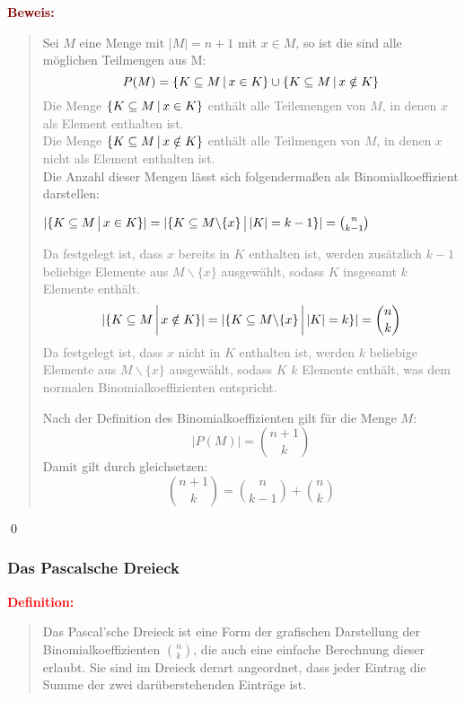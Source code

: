 \documentclass{article}
\newcommand{\smsp}{\phantom{\hspace{3px}}}
\newcommand{\red}[1]{\textcolor{red}{#1}}
\newcommand{\gray}[1]{\textcolor{gray}{#1}}
\newcommand{\maroon}[1]{\textcolor{maroon}{#1}}
\newcommand{\de}[1]{\red{\textbf{Definition: }}\begin{quote}#1\end{quote}}
\newcommand{\pr}[1]{\maroon{\textbf{Beweis: }}\begin{quote}#1\end{quote}\qed}
\newcommand{\vst}{\smsp \vline \smsp}
\newcommand{\bs}{\backslash}
\begin{document}
\pr{
    Sei $M$ eine Menge mit $|M| = n + 1$ mit $x \in M$, so ist die sind alle möglichen Teilmengen aus M:
    \begin{equation*}
        P(M) = \{K \subseteq M \vst x \in K\} \cup \{K \subseteq M \vst x \notin K\}
    \end{equation*}
    \gray{Die Menge $\{K \subseteq M \vst x \in K\}$ enthält alle Teilemengen von $M$, in denen $x$ als Element enthalten ist.\\ Die Menge $\{K \subseteq M \vst x \notin K\}$ enthält alle Teilmengen von $M$, in denen $x$ nicht als Element enthalten ist.}\\
    Die Anzahl dieser Mengen lässt sich folgendermaßen als Binomialkoeffizient darstellen:
    \begin{center}
        $|\{K \subseteq M \vst x \in K\}| = |\{K \subseteq M \bs \{x\} \vst |K| = k - 1\}| = \binom{n}{k - 1}$
    \end{center}
    \gray{Da festgelegt ist, dass $x$ bereits in $K$ enthalten ist, werden zusätzlich $k - 1$ beliebige Elemente aus $M \bs \{x\}$ ausgewählt, sodass $K$ insgesamt $k$ Elemente enthält.}
    \begin{equation*}
        |\{K \subseteq M \vst x \notin K\}| = |\{K \subseteq M \bs \{x\} \vst |K| = k\}| = \binom{n}{k}
    \end{equation*}
    \gray{Da festgelegt ist, dass $x$ nicht in $K$ enthalten ist, werden $k$ beliebige Elemente aus $M \bs \{x\}$ ausgewählt, sodass $K$ $k$ Elemente enthält, was dem normalen Binomialkoeffizienten entspricht.}

    Nach der Definition des Binomialkoeffizienten gilt für die Menge $M$:
    \begin{equation*}
        |P(M)| = \binom{n + 1}{k}
    \end{equation*}
    Damit gilt durch gleichsetzen:
    \begin{equation*}
        \binom{n + 1}{k} = \binom{n}{k - 1} + \binom{n}{k}
    \end{equation*}
}

\newpage

\subsubsection{Das Pascalsche Dreieck}

\de{Das Pascal'sche Dreieck ist eine Form der grafischen Darstellung der Binomialkoeffizienten $\binom{n}{k}$, die auch eine einfache Berechnung dieser erlaubt. Sie sind im Dreieck derart angeordnet, dass jeder Eintrag die Summe der zwei darüberstehenden Einträge ist.}
\end{document}
